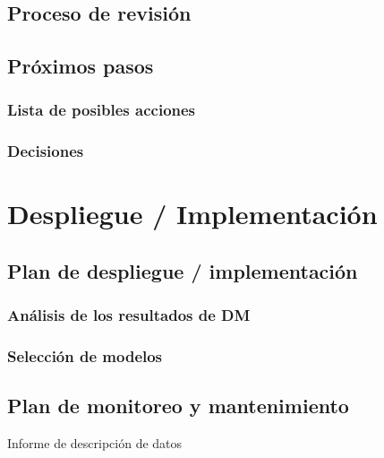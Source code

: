\documentclass[11pt,a4paper,twoside]{tesis}
\begin{document}
\section{Proceso de revisión}
\section{Próximos pasos}

\subsection{Lista de posibles acciones}
\subsection{Decisiones}


\chapter{Despliegue / Implementación}
\section{Plan de despliegue / implementación}
\subsection{Análisis de los resultados de DM}
\subsection{Selección de modelos}
\section{Plan de monitoreo y mantenimiento}
Informe de descripción de datos
\end{document}

